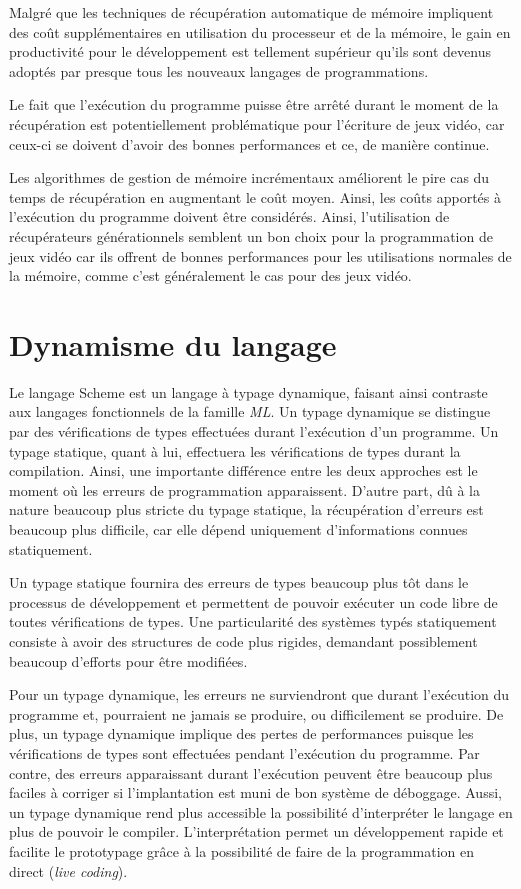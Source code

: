 \documentclass[12pt,oneside,letterpaper,francais]{book}
\begin{document}
Malgré que les techniques de récupération automatique de mémoire
impliquent des coût supplémentaires en utilisation du processeur et de
la mémoire, le gain en productivité pour le développement est
tellement supérieur qu'ils sont devenus adoptés par presque tous les
nouveaux langages de programmations.

Le fait que l'exécution du programme puisse être arrêté durant le
moment de la récupération est potentiellement problématique pour
l'écriture de jeux vidéo, car ceux-ci se doivent d'avoir des bonnes
performances et ce, de manière continue. 

Les algorithmes de gestion de mémoire incrémentaux améliorent le pire
cas du temps de récupération en augmentant le coût moyen. Ainsi, les
coûts apportés à l'exécution du programme doivent être
considérés. Ainsi, l'utilisation de récupérateurs générationnels
semblent un bon choix pour la programmation de jeux vidéo car ils
offrent de bonnes performances pour les utilisations normales de la
mémoire, comme c'est généralement le cas pour des jeux vidéo.



\section{Dynamisme du langage}

Le langage Scheme est un langage à typage dynamique, faisant ainsi
contraste aux langages fonctionnels de la famille \textit{ML}. Un
typage dynamique se distingue par des vérifications de types
effectuées durant l'exécution d'un programme. Un typage statique,
quant à lui, effectuera les vérifications de types durant la
compilation. Ainsi, une importante différence entre les deux approches
est le moment où les erreurs de programmation apparaissent. D'autre
part, dû à la nature beaucoup plus stricte du typage statique, la
récupération d'erreurs est beaucoup plus difficile, car elle dépend
uniquement d'informations connues statiquement.

Un typage statique fournira des erreurs de types beaucoup plus tôt
dans le processus de développement et permettent de pouvoir exécuter
un code libre de toutes vérifications de types. Une particularité des
systèmes typés statiquement consiste à avoir des structures de code
plus rigides, demandant possiblement beaucoup d'efforts pour être
modifiées. 

Pour un typage dynamique, les erreurs ne surviendront que durant
l'exécution du programme et, pourraient ne jamais se produire, ou
difficilement se produire. De plus, un typage dynamique implique des
pertes de performances puisque les vérifications de types sont
effectuées pendant l'exécution du programme. Par contre, des erreurs
apparaissant durant l'exécution peuvent être beaucoup plus faciles à
corriger si l'implantation est muni de bon système de
déboggage. Aussi, un typage dynamique rend plus accessible la
possibilité d'interpréter le langage en plus de pouvoir le
compiler. L'interprétation permet un développement rapide et facilite
le prototypage grâce à la possibilité de faire de la programmation en
direct (\textit{live coding}).
\end{document}

